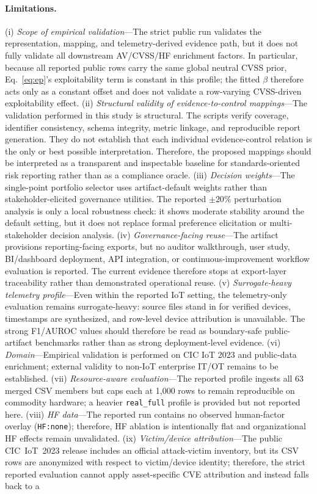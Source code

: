 \documentclass[preprint,12pt]{elsarticle}
\def\textsubscript#1{#1}%
\begin{document}
\paragraph{Limitations.} (i) \emph{Scope of empirical validation}---The strict public run validates the representation, mapping, and telemetry-derived evidence path, but it does not fully validate all downstream AV/CVSS/HF enrichment factors. In particular, because all reported public rows carry the same global neutral CVSS prior, Eq.~\eqref{eq:ep}'s exploitability term is constant in this profile; the fitted $\beta$ therefore acts only as a constant offset and does not validate a row-varying CVSS-driven exploitability effect. (ii) \emph{Structural validity of evidence-to-control mappings}---The validation performed in this study is structural. The scripts verify coverage, identifier consistency, schema integrity, metric linkage, and reproducible report generation. They do not establish that each individual evidence-control relation is the only or best possible interpretation. Therefore, the proposed mappings should be interpreted as a transparent and inspectable baseline for standards-oriented risk reporting rather than as a compliance oracle. (iii) \emph{Decision weights}---The single-point portfolio selector uses artifact-default weights rather than stakeholder-elicited governance utilities. The reported $\pm 20\%$ perturbation analysis is only a local robustness check: it shows moderate stability around the default setting, but it does not replace formal preference elicitation or multi-stakeholder decision analysis. (iv) \emph{Governance-facing reuse}---The artifact provisions reporting-facing exports, but no auditor walkthrough, user study, BI/dashboard deployment, API integration, or continuous-improvement workflow evaluation is reported. The current evidence therefore stops at export-layer traceability rather than demonstrated operational reuse. (v) \emph{Surrogate-heavy telemetry profile}---Even within the reported IoT setting, the telemetry-only evaluation remains surrogate-heavy: source files stand in for verified devices, timestamps are synthesized, and row-level device attribution is unavailable. The strong F\textsubscript{1}/AUROC values should therefore be read as boundary-safe public-artifact benchmarks rather than as strong deployment-level evidence. (vi) \emph{Domain}---Empirical validation is performed on CIC IoT 2023 and public-data enrichment; external validity to non-IoT enterprise IT/OT remains to be established. (vii) \emph{Resource-aware evaluation}---The reported profile ingests all 63 merged CSV members but caps each at 1{,}000 rows to remain reproducible on commodity hardware; a heavier \texttt{real\_full} profile is provided but not reported here. (viii) \emph{HF data}---The reported run contains no observed human-factor overlay (\texttt{HF:none}); therefore, HF ablation is intentionally flat and organizational HF effects remain unvalidated. (ix) \emph{Victim/device attribution}---The public CIC~IoT~2023 release includes an official attack-victim inventory, but its CSV rows are anonymized with respect to victim/device identity; therefore, the strict reported evaluation cannot apply asset-specific CVE attribution and instead falls back to a 
\end{document}
